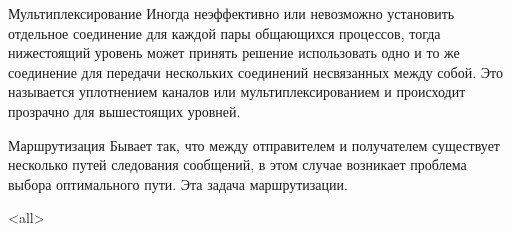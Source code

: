 \begin{frame}{Мультиплексирование}
	Иногда неэффективно или невозможно установить отдельное соединение для каждой пары общающихся процессов,  тогда нижестоящий уровень может принять решение использовать одно и то же соединение для передачи нескольких соединений несвязанных между собой. Это называется уплотнением каналов или мультиплексированием и происходит прозрачно для вышестоящих уровней.
\end{frame}

\begin{frame}{Маршрутизация}
	Бывает так,  что между отправителем и получателем существует несколько путей следования сообщений,  в этом случае возникает проблема выбора оптимального пути. Эта задача маршрутизации.
\end{frame}

\mode<all>{}


